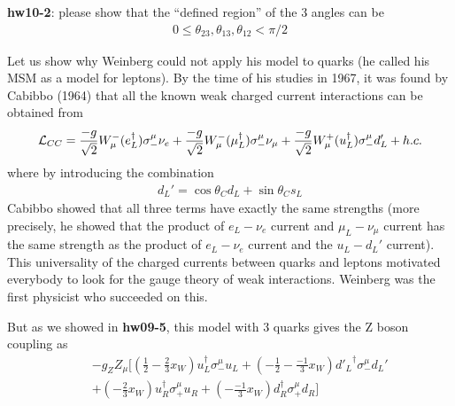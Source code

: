 \documentclass[12pt]{article}
\begin{document}
{\bf hw10-2}: please show that the ``defined region'' of the 3 angles can be
\begin{eqnarray}
  0 \le \theta_{23}, \theta_{13}, \theta_{12} < \pi/2
\end{eqnarray}
  
  Let us show why Weinberg could not apply his model to quarks (he called his MSM as a model for leptons).  By the time of his studies in 1967, it was found by Cabibbo (1964) that all the known weak charged current interactions can be obtained from
  \begin{eqnarray}
    {\cal L}_{CC}
  =
  \frac{-g}{\sqrt{2}} W^-_\mu (e_L^\dagger)  \sigma_-^\mu \nu_e +
  \frac{-g}{\sqrt{2}} W^-_\mu (\mu_L^\dagger) \sigma_-^\mu \nu_\mu +
  \frac{-g}{\sqrt{2}} W^+_\mu (u_L^\dagger)  \sigma_-^\mu d_L'
  + h.c.
  \end{eqnarray}  
   where by introducing the combination
\begin{eqnarray}
  d_L' = \cos\theta_C d_L + \sin\theta_C s_L
\end{eqnarray}
  Cabibbo showed that all three terms have exactly the same strengths
  (more precisely, he showed that the product of $e_L-\nu_e$ current and
  $\mu_L-\nu_\mu$ current has the same strength as the product of $e_L-\nu_e$ current and the $u_L-d_L'$ current). This universality of the charged currents between quarks and leptons motivated everybody to look for the gauge
  theory of weak interactions.  Weinberg was the first physicist who
  succeeded on this.

  But as we showed in {\bf hw09-5}, this model with 3 quarks gives the Z boson
  coupling as
\begin{eqnarray}
  &&-g_Z Z_\mu [(\frac{1}{2}-\frac{2}{3}x_W) u_L^\dagger  \sigma_-^\mu u_L
  + (-\frac{1}{2}-\frac{-1}{3}x_W) {d'_L}^\dagger \sigma_-^\mu d_L' \nonumber\\
  &&+ (    -\frac{2}{3}x_W) u_R^\dagger  \sigma_+^\mu u_R
  + (    -\frac{-1}{3}x_W) d_R^\dagger  \sigma_+^\mu d_R ]
\end{eqnarray}
\end{document}
